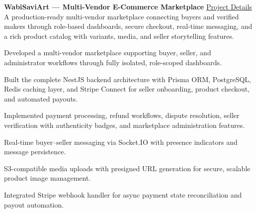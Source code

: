 \textbf{WabiSaviArt --- Multi-Vendor E-Commerce Marketplace}
\hfill
\href{https://ahasnat.dev/projects/wabisaviart}{Project Details} \\
A production-ready multi-vendor marketplace connecting buyers and verified makers through role-based dashboards, secure checkout, real-time messaging, and a rich product catalog with variants, media, and seller storytelling features.
\begin{zitemize}
    \item Developed a multi-vendor marketplace supporting buyer, seller, and administrator workflows through fully isolated, role-scoped dashboards.
    \item Built the complete NestJS backend architecture with Prisma ORM, PostgreSQL, Redis caching layer, and Stripe Connect for seller onboarding, product checkout, and automated payouts.
    \item Implemented payment processing, refund workflows, dispute resolution, seller verification with authenticity badges, and marketplace administration features.
    \item Real-time buyer--seller messaging via Socket.IO with presence indicators and message persistence.
    \item S3-compatible media uploads with presigned URL generation for secure, scalable product image management.
    \item Integrated Stripe webhook handler for async payment state reconciliation and payout automation.
\end{zitemize}

\vspace{0.5em}

